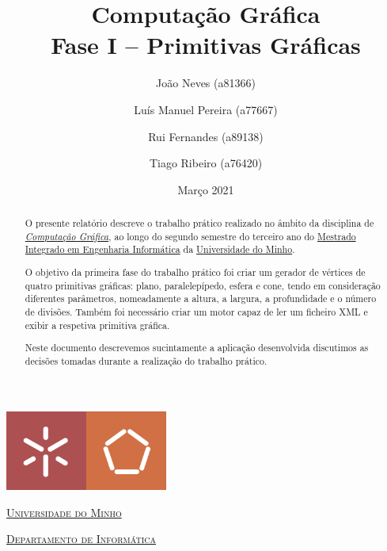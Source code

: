 \documentclass[a4paper, 11pt]{article}
\title{Computação Gráfica \\ \Large Fase I -- Primitivas Gráficas}
\author{João Neves (a81366) \and Luís Manuel Pereira (a77667) \and Rui Fernandes (a89138) \and 
Tiago Ribeiro (a76420)}
\date{Março 2021}
\begin{document}
\begin{titlepage}
    \begin{center}
        \begin{minipage}{0.75\linewidth}
            \centering
            \includegraphics[width=0.4\textwidth]{img/EEUM.png}\par\vspace{1cm}
            \vspace{1.5cm}
            \href{https://www.uminho.pt/PT}{\scshape\LARGE Universidade do Minho} \par
            \vspace{1cm}
            \href{https://www.di.uminho.pt/}{\scshape\Large Departamento de Informática} \par
            \vspace{1.5cm}
            \maketitle
        \end{minipage}
    \end{center}
    \vspace{2cm}
    \thispagestyle{empty}
    \clearpage
\end{titlepage}


\begin{abstract}
O presente relatório descreve o trabalho prático realizado no âmbito da disciplina de
\href{https://miei.di.uminho.pt/plano_estudos.html#computa_o_gr_fica}
{\emph{Computação Gráfica}}, ao longo do segundo semestre
do terceiro ano do \href{http://miei.di.uminho.pt}{Mestrado Integrado em Engenharia Informática}
da \href{https://www.uminho.pt}{Universidade do Minho}.

O objetivo da primeira fase do trabalho prático foi criar um gerador de vértices de quatro 
primitivas gráficas: plano, paralelepípedo, esfera e cone, tendo em consideração diferentes 
parâmetros, nomeadamente a  altura, a largura, a profundidade e o número de divisões. Também foi 
necessário criar um motor capaz de ler um ficheiro XML e exibir a respetiva primitiva gráfica.

Neste documento descrevemos sucintamente a aplicação desenvolvida discutimos as decisões tomadas 
durante a realização do trabalho prático.
\end{abstract}
\end{document}
